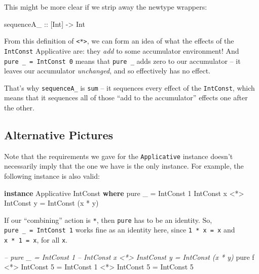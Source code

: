 \documentclass[]{article}
\newenvironment{Shaded}{}{}
\newcommand{\CommentTok}[1]{\textcolor[rgb]{0.38,0.63,0.69}{\textit{#1}}}
\newcommand{\DataTypeTok}[1]{\textcolor[rgb]{0.56,0.13,0.00}{#1}}
\newcommand{\DecValTok}[1]{\textcolor[rgb]{0.25,0.63,0.44}{#1}}
\newcommand{\FunctionTok}[1]{\textcolor[rgb]{0.02,0.16,0.49}{#1}}
\newcommand{\KeywordTok}[1]{\textcolor[rgb]{0.00,0.44,0.13}{\textbf{#1}}}
\newcommand{\NormalTok}[1]{#1}
\newcommand{\OtherTok}[1]{\textcolor[rgb]{0.00,0.44,0.13}{#1}}
\begin{document}
This might be more clear if we strip away the newtype wrappers:

\begin{Shaded}
\begin{Highlighting}[]
\OtherTok{sequenceA_ ::}\NormalTok{ [}\DataTypeTok{Int}\NormalTok{] }\OtherTok{->} \DataTypeTok{Int}
\end{Highlighting}
\end{Shaded}

From this definition of \texttt{\textless{}*\textgreater{}}, we can form an idea
of what the effects of the \texttt{IntConst} Applicative are: they \emph{add} to
some accumulator environment! And \texttt{pure\ \_\ =\ IntConst\ 0} means that
\texttt{pure\ \_} adds zero to our accumulator -- it leaves our accumulator
\emph{unchanged}, and so effectively has no effect.

That's why \texttt{sequenceA\_} is \texttt{sum} -- it sequences every effect of
the \texttt{IntConst}, which means that it sequences all of those ``add to the
accumulator'' effects one after the other.

\hypertarget{alternative-pictures}{%
\subsection{Alternative Pictures}\label{alternative-pictures}}

Note that the requirements we gave for the \texttt{Applicative} instance doesn't
necessarily imply that the one we have is the only instance. For example, the
following instance is also valid:

\begin{Shaded}
\begin{Highlighting}[]
\KeywordTok{instance} \DataTypeTok{Applicative} \DataTypeTok{IntConst} \KeywordTok{where}
\NormalTok{    pure _ }\FunctionTok{=} \DataTypeTok{IntConst} \DecValTok{1}
    \DataTypeTok{IntConst}\NormalTok{ x }\FunctionTok{<*>} \DataTypeTok{IntConst}\NormalTok{ y }\FunctionTok{=} \DataTypeTok{IntConst}\NormalTok{ (x }\FunctionTok{*}\NormalTok{ y)}
\end{Highlighting}
\end{Shaded}

If our ``combining'' action is \texttt{*}, then \texttt{pure} has to be an
identity. So, \texttt{pure\ \_\ =\ IntConst\ 1} works fine as an identity here,
since \texttt{1\ *\ x\ =\ x} and \texttt{x\ *\ 1\ =\ x}, for all \texttt{x}.

\begin{Shaded}
\begin{Highlighting}[]
\CommentTok{-- pure _ = IntConst 1}
\CommentTok{-- IntConst x <*> InstConst y = IntConst (x * y)}
\NormalTok{pure f }\FunctionTok{<*>} \DataTypeTok{IntConst} \DecValTok{5} \FunctionTok{=} \DataTypeTok{IntConst} \DecValTok{1} \FunctionTok{<*>} \DataTypeTok{IntConst} \DecValTok{5}
                      \FunctionTok{=} \DataTypeTok{IntConst} \DecValTok{5}
\end{Highlighting}
\end{Shaded}
\end{document}
